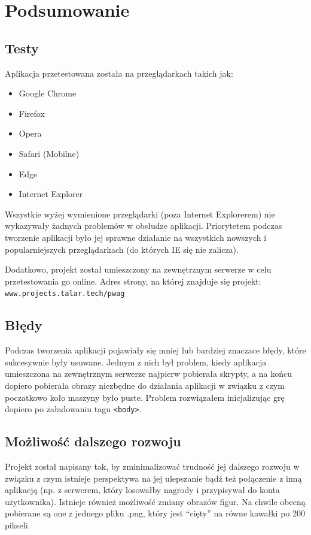 \documentclass[a4paper,11pt,titlepage]{article}
\begin{document}
\section{Podsumowanie}
\subsection{Testy}
Aplikacja przetestowana została na przeglądarkach takich jak:
\begin{itemize}
	\item Google Chrome
	\item Firefox
	\item Opera
	\item Safari (Mobilne)
	\item Edge
	\item Internet Explorer
\end{itemize}

Wszystkie wyżej wymienione przeglądarki (poza Internet Explorerem) nie wykazywały żadnych problemów w obsłudze aplikacji. Priorytetem podczas tworzenie aplikacji było jej sprawne działanie na wszystkich nowszych i popularniejszych przeglądarkach (do których IE się nie zalicza).

Dodatkowo, projekt został umieszczony na zewnętrznym serwerze w celu przetestowania go online. Adres strony, na której znajduje się projekt: \newline \verb|www.projects.talar.tech/pwag|

\subsection{Błędy}
Podczas tworzenia aplikacji pojawiały się mniej lub bardziej znaczace błędy, które sukcesywnie były usuwane. Jednym z nich był problem, kiedy aplikacja umieszczona na zewnętrznym serwerze najpierw pobierała skrypty, a na końcu dopiero pobierała obrazy niezbędne do działania aplikacji w związku z czym poczatkowo koło maszyny było puste. Problem rozwiązałem inicjalizując grę dopiero po załadowaniu tagu \verb|<body>|.

\subsection{Możliwość dalszego rozwoju}
Projekt został napisany tak, by zminimalizować trudność jej dalszego rozwoju w związku z czym istnieje perspektywa na jej ulepszanie bądź też połączenie z inną aplikacją (np. z serwerem, który losowałby nagrody i przypisywał do konta użytkownika). Istnieje również możliwość zmiany obrazów figur. Na chwile obecną pobierane są one z jednego pliku .png, który jest ``cięty'' na równe kawałki po 200 pikseli.
\end{document}
